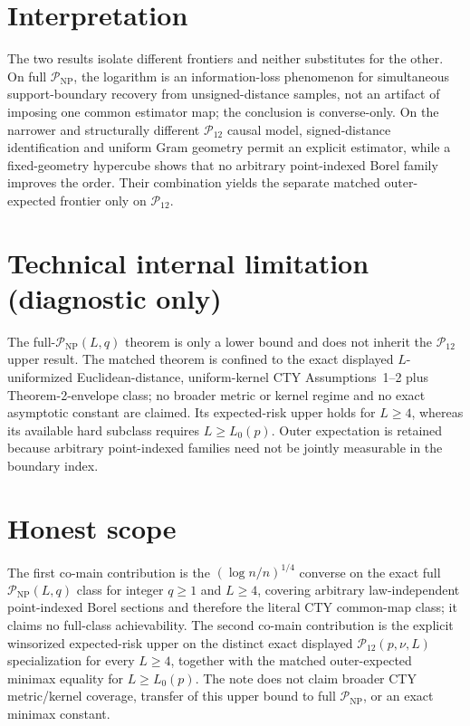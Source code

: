 \documentclass{article}
\begin{document}
\section{Interpretation}

The two results isolate different frontiers and neither substitutes for the other.  On full \(\mathcal P_{\mathrm{NP}}\), the logarithm is an information-loss phenomenon for simultaneous support-boundary recovery from unsigned-distance samples, not an artifact of imposing one common estimator map; the conclusion is converse-only.  On the narrower and structurally different \(\mathcal P_{12}\) causal model, signed-distance identification and uniform Gram geometry permit an explicit estimator, while a fixed-geometry hypercube shows that no arbitrary point-indexed Borel family improves the order.  Their combination yields the separate matched outer-expected frontier only on \(\mathcal P_{12}\).

\section*{Technical internal limitation (diagnostic only)}

The full-\(\mathcal P_{\mathrm{NP}}(L,q)\) theorem is only a lower bound and does not inherit the \(\mathcal P_{12}\) upper result.  The matched theorem is confined to the exact displayed \(L\)-uniformized Euclidean-distance, uniform-kernel CTY Assumptions~1--2 plus Theorem-2-envelope class; no broader metric or kernel regime and no exact asymptotic constant are claimed.  Its expected-risk upper holds for \(L\geq4\), whereas its available hard subclass requires \(L\geq L_0(p)\).  Outer expectation is retained because arbitrary point-indexed families need not be jointly measurable in the boundary index.

\section{Honest scope}

The first co-main contribution is the \((\log n/n)^{1/4}\) converse on the exact full \(\mathcal P_{\mathrm{NP}}(L,q)\) class for integer \(q\geq1\) and \(L\geq4\), covering arbitrary law-independent point-indexed Borel sections and therefore the literal CTY common-map class; it claims no full-class achievability.  The second co-main contribution is the explicit winsorized expected-risk upper on the distinct exact displayed \(\mathcal P_{12}(p,\nu,L)\) specialization for every \(L\geq4\), together with the matched outer-expected minimax equality for \(L\geq L_0(p)\).  The note does not claim broader CTY metric/kernel coverage, transfer of this upper bound to full \(\mathcal P_{\mathrm{NP}}\), or an exact minimax constant.
\end{document}
